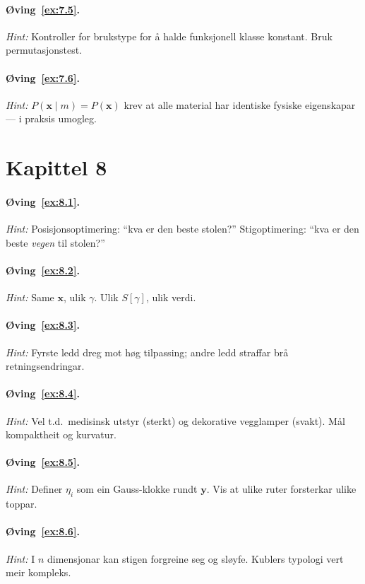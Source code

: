 \paragraph{Øving~\ref{ex:7.5}.}
\emph{Hint:} Kontroller for brukstype for å halde funksjonell
klasse konstant. Bruk permutasjonstest.

\paragraph{Øving~\ref{ex:7.6}.}
\emph{Hint:} $P(\bm{x} \mid m) = P(\bm{x})$ krev at alle material
har identiske fysiske eigenskapar --- i praksis umogleg.


\section*{Kapittel 8}

\paragraph{Øving~\ref{ex:8.1}.}
\emph{Hint:} Posisjonsoptimering: ``kva er den beste stolen?''
Stigoptimering: ``kva er den beste \emph{vegen} til stolen?''

\paragraph{Øving~\ref{ex:8.2}.}
\emph{Hint:} Same $\bm{x}$, ulik $\gamma$. Ulik $S[\gamma]$,
ulik verdi.

\paragraph{Øving~\ref{ex:8.3}.}
\emph{Hint:} Fyrste ledd dreg mot høg tilpassing; andre ledd
straffar brå retningsendringar.

\paragraph{Øving~\ref{ex:8.4}.}
\emph{Hint:} Vel t.d.\ medisinsk utstyr (sterkt) og dekorative
vegglamper (svakt). Mål kompaktheit og kurvatur.

\paragraph{Øving~\ref{ex:8.5}.}
\emph{Hint:} Definer $\eta_i$ som ein Gauss-klokke rundt $\bm{y}$.
Vis at ulike ruter forsterkar ulike toppar.

\paragraph{Øving~\ref{ex:8.6}.}
\emph{Hint:} I $n$ dimensjonar kan stigen forgreine seg og sløyfe.
Kublers typologi vert meir kompleks.


